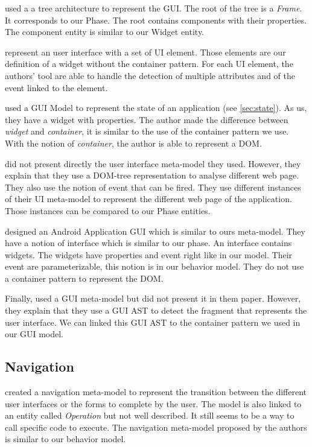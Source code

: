 \documentclass[conference]{IEEEtran}
\begin{document}
\citet{shah2011reverse} used a a tree architecture to represent the GUI.
The root of the tree is a \textit{Frame}.
It corresponds to our Phase.
The root contains components with their properties.
The component entity is similar to our Widget entity.

\citet{joorabchi2012reverse} represent an user interface with a set of UI element.
Those elements are our definition of a widget without the container pattern.
For each UI element, the authors' tool are able to handle the detection
    of multiple attributes and of the event linked to the element.

\citet{memon2007eventflow} used a GUI Model to represent the state of an application (see \ref{sec:state}).
As us, they have a widget with properties.
The author made the difference between \textit{widget} and \textit{container},
    it is similar to the use of the container pattern we use.
With the notion of \textit{container}, the author is able to represent a DOM.

\citet{mesbah2012crawling} did not present directly the user interface meta-model they used.
However, they explain that they use a DOM-tree representation to
    analyse different web page.
They also use the notion of event that can be fired.
They use different instances of their UI meta-model to represent the different web page of the application.
Those instances can be compared to our Phase entities.

\citet{amalfitano2012using} designed an Android Application GUI which is similar to ours meta-model.
They have a notion of interface which is similar to our phase.
An interface contains widgets.
The widgets have properties and event right like in our model.
Their event are parameterizable, this notion is in our behavior model.
They do not use a container pattern to represent the DOM.

Finally, \citet{silva2010guisurfer} used a GUI meta-model but did not present it
    in them paper.
However, they explain that they use a GUI AST to detect the fragment that represents the user interface.
We can linked this GUI AST to the container pattern we used in our GUI model.

\subsection{Navigation}
\label{sec:navigation}

\citet{fleurey2007model} created a navigation meta-model to represent the
    transition between the different user interfaces or the forms to complete by the user.
The model is also linked to an entity called \textit{Operation} but not well described.
It still seems to be a way to call specific code to execute.
The navigation meta-model proposed by the authors is similar to our behavior model.
\end{document}
